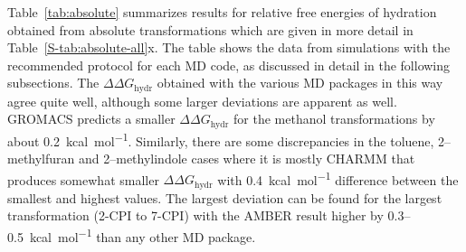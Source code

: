 \documentclass[journal=jctcce,manuscript=article]{achemso}
\begin{document}
Table~\ref{tab:absolute} summarizes results for relative free energies of 
hydration obtained from absolute transformations which are given in more detail in Table~\ref{S-tab:absolute-all}x.  The table shows the data 
from simulations with the recommended protocol for each MD code, as discussed in detail in the 
following subsections. The $\Delta\Delta G_{\mathrm{hydr}}$ 
obtained with the various MD packages in 
this way agree quite well, although some larger deviations are apparent as 
well.  GROMACS predicts a smaller $\Delta\Delta G_{\mathrm{hydr}}$ for the 
methanol transformations by about \SI{0.2}{kcal.mol^{-1}}.  Similarly, there 
are some discrepancies in the toluene, 2--methylfuran and 2--methylindole cases 
where it is mostly CHARMM that produces somewhat smaller $\Delta\Delta 
G_{\mathrm{hydr}}$ with \SI{0.4}{kcal.mol^{-1}} difference between the 
smallest and highest values.  The largest deviation can be found for the largest 
transformation (2-CPI to 7-CPI) with the AMBER result higher by 0.3--\SI{0.5}{kcal.mol^{-1}} than any other MD package.
\begin{table}[]
  \begin{minipage}{\linewidth}
    \caption{Comparing relative free energies of hydration for various MD 
    packages as obtained from the absolute protocol.}\label{tab:absolute}
  \end{minipage}
\end{table}
\end{document}
